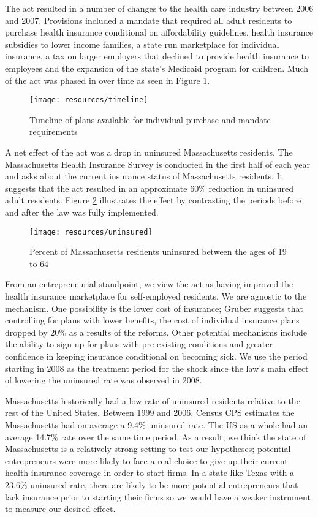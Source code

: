 \documentclass[12pt]{article}
\begin{document}
The act resulted in a number of changes to the health care industry between 2006 and 2007. Provisions included a mandate that required all adult residents to purchase health insurance conditional on affordability guidelines, health insurance subsidies to lower income families, a state run marketplace for individual insurance, a tax on larger employers that declined to provide health insurance to employees and the expansion of the state's Medicaid program for children. Much of the act was phased in over time as seen in Figure \ref{fig:reformTimeline}.

\begin{figure}[H]
	\centering
	\texttt{[image: resources/timeline]}
	\caption{Timeline of plans available for individual purchase and mandate requirements}
	\label{fig:reformTimeline}
\end{figure}

A net effect of the act was a drop in uninsured Massachusetts residents. The Massachusetts Health Insurance Survey is conducted in the first half of each year and asks about the current insurance status of Massachusetts residents. It suggests that the act resulted in an approximate 60\% reduction in uninsured adult residents. Figure \ref{fig:uninsuredRate} illustrates the effect by contrasting the periods before and after the law was fully implemented. 

\begin{figure}[H]
	\centering
	\texttt{[image: resources/uninsured]}
	\caption{Percent of Massachusetts residents uninsured between the ages of 19 to 64}
	\label{fig:uninsuredRate}
\end{figure}

From an entrepreneurial standpoint, we view the act as having improved the health insurance marketplace for self-employed residents. We are agnostic to the mechanism. One possibility is the lower cost of insurance; Gruber \cite{gruber_mass} suggests that controlling for plans with lower benefits, the cost of individual insurance plans dropped by 20\% as a results of the reforms. Other potential mechanisms include the ability to sign up for plans with pre-existing conditions and greater confidence in keeping insurance conditional on becoming sick. We use the period starting in 2008 as the treatment period for the shock since the law's main effect of lowering the uninsured rate was observed in 2008. 

Massachusetts historically had a low rate of uninsured residents relative to the rest of the United States. Between 1999 and 2006, Census CPS estimates the Massachusetts had on average a 9.4\% uninsured rate. The US as a whole had an average 14.7\% rate over the same time period. As a result, we think the state of Massachusetts is a relatively strong setting to test our hypotheses; potential entrepreneurs were more likely to face a real choice to give up their current health insurance coverage in order to start firms. In a state like Texas with a 23.6\% uninsured rate, there are likely to be more potential entrepreneurs that lack insurance prior to starting their firms so we would have a weaker instrument to measure our desired effect. 
\end{document}
